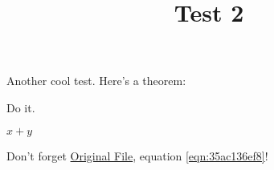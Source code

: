 \documentclass[reqno]{amsart} 
\title{Test 2}
\begin{document}
Another cool test.  Here's a theorem:
\begin{theorem}\label{theorem:35ac204d35}
  Do it.
\end{theorem}

$x + y$

Don't forget \href{test.pdf}{Original File}, equation \eqref{eqn:35ac136ef8}!





{} 
\end{document}

